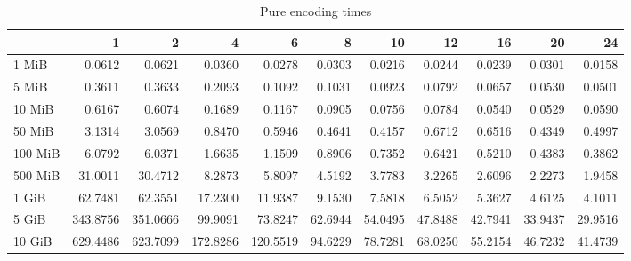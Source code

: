 \begin{table}[!h]
	\caption{Pure encoding times}
	\begin{tabular}{lrrrrrrrrrr}
		\toprule
		{} &        1  &        2  &        4  &        6  &       8  &       10 &       12 &       16 &       20 &       24 \\
		\midrule
		1 MiB   &    0.0612 &    0.0621 &    0.0360 &    0.0278 &   0.0303 &   0.0216 &   0.0244 &   0.0239 &   0.0301 &   0.0158 \\
		5 MiB   &    0.3611 &    0.3633 &    0.2093 &    0.1092 &   0.1031 &   0.0923 &   0.0792 &   0.0657 &   0.0530 &   0.0501 \\
		10 MiB  &    0.6167 &    0.6074 &    0.1689 &    0.1167 &   0.0905 &   0.0756 &   0.0784 &   0.0540 &   0.0529 &   0.0590 \\
		50 MiB  &    3.1314 &    3.0569 &    0.8470 &    0.5946 &   0.4641 &   0.4157 &   0.6712 &   0.6516 &   0.4349 &   0.4997 \\
		100 MiB &    6.0792 &    6.0371 &    1.6635 &    1.1509 &   0.8906 &   0.7352 &   0.6421 &   0.5210 &   0.4383 &   0.3862 \\
		500 MiB &   31.0011 &   30.4712 &    8.2873 &    5.8097 &   4.5192 &   3.7783 &   3.2265 &   2.6096 &   2.2273 &   1.9458 \\
		1 GiB   &   62.7481 &   62.3551 &   17.2300 &   11.9387 &   9.1530 &   7.5818 &   6.5052 &   5.3627 &   4.6125 &   4.1011 \\
		5 GiB   &  343.8756 &  351.0666 &   99.9091 &   73.8247 &  62.6944 &  54.0495 &  47.8488 &  42.7941 &  33.9437 &  29.9516 \\
		10 GiB  &  629.4486 &  623.7099 &  172.8286 &  120.5519 &  94.6229 &  78.7281 &  68.0250 &  55.2154 &  46.7232 &  41.4739 \\
		\bottomrule
	\end{tabular}
\end{table}
